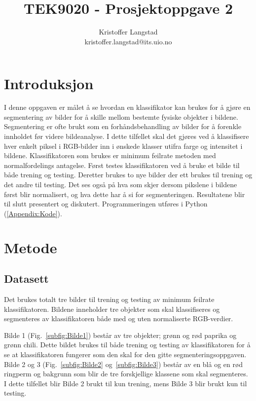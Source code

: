 \documentclass[twocolumn,norwegian]{article}
\title{TEK9020 - Prosjektoppgave 2}
\author{Kristoffer Langstad \\ kristoffer.langstad@its.uio.no}
\date{}
\begin{document}
	
	\maketitle
	
	\section{Introduksjon}
	I denne oppgaven er målet å se hvordan en klassifikator kan brukes for å gjøre en segmentering av bilder for å skille mellom bestemte fysiske objekter i bildene. Segmentering er ofte brukt som en forhåndsbehandling av bilder for å forenkle innholdet før videre bildeanalyse. I dette tilfellet skal det gjøres ved å klassifisere hver enkelt piksel i RGB-bilder inn i ønskede klasser utifra farge og intensitet i bildene. Klassifikatoren som brukes er minimum feilrate metoden med normalfordelings antagelse. Først testes klassifikatoren ved å bruke et bilde til både trening og testing. Deretter brukes to nye bilder der ett brukes til trening og det andre til testing. Det ses også på hva som skjer dersom pikslene i bildene først blir normalisert, og hva dette har å si for segmenteringen. Resultatene blir til slutt presentert og diskutert. Programmeringen utføres i Python (\ref{Appendix:Kode}).


	\section{Metode}
	\subsection{Datasett}
	Det brukes totalt tre bilder til trening og testing av minimum feilrate klassifikatoren. Bildene inneholder tre objekter som skal klassifiseres og segmenteres av klassifikatoren både med og uten normaliserte RGB-verdier.
	
	Bilde 1 (Fig.~\ref{subfig:Bilde1}) består av tre objekter; grønn og rød paprika og grønn chili. Dette bildet brukes til både trening og testing av klassifikatoren for å se at klassifikatoren fungerer som den skal for den gitte segmenteringsoppgaven. Bilde 2 og 3 (Fig.~\ref{subfig:Bilde2} og~\ref{subfig:Bilde3}) består av en blå og en rød ringperm og bakgrunn som blir de tre forskjellige klassene som skal segmenteres. I dette tilfellet blir Bilde 2 brukt til kun trening, mens Bilde 3 blir brukt kun til testing. 
	
\end{document}
